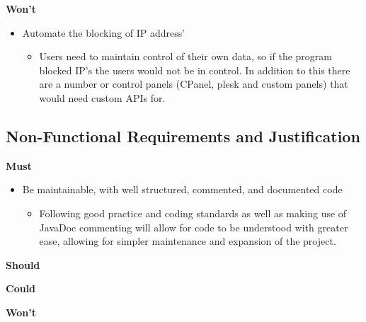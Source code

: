 \textbf{Won't}
\begin{itemize}
    \item Automate the blocking of IP address' 
    \begin{itemize}
        \item Users need to maintain control of their own data, so if the program blocked IP's the users would not be in control. In addition to this there are a number or control panels (CPanel, plesk and custom panels) that would need custom APIs for.
    \end{itemize}
\end{itemize}
\subsection{Non-Functional Requirements and Justification}
\textbf{Must}
\begin{itemize}
    \item Be maintainable, with well structured, commented, and documented code
    \begin{itemize}
        \item Following good practice and coding standards as well as making use of JavaDoc commenting will allow for code to be understood with greater ease, allowing for simpler maintenance and expansion of the project. 
    \end{itemize}
\end{itemize}
\textbf{Should}

\textbf{Could}

\textbf{Won't}